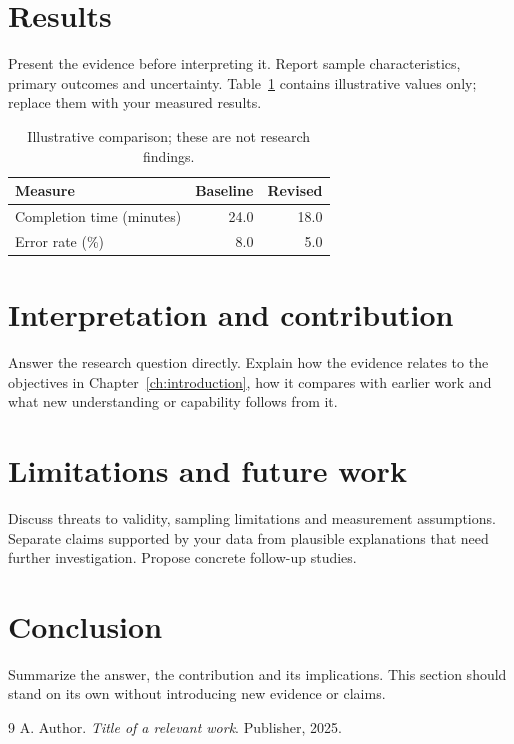 \documentclass[11pt,a4paper,oneside]{report}
\begin{document}
\section{Results}
Present the evidence before interpreting it. Report sample characteristics,
primary outcomes and uncertainty. Table~\ref{tab:outcomes} contains illustrative
values only; replace them with your measured results.
\begin{table}[htbp]
\centering
\caption{Illustrative comparison; these are not research findings.}
\label{tab:outcomes}
\begin{tabularx}{\linewidth}{@{}Xrr@{}}
\toprule
\textbf{Measure} & \textbf{Baseline} & \textbf{Revised}\\
\midrule
Completion time (minutes) & 24.0 & 18.0\\
Error rate (\%) & 8.0 & 5.0\\
\bottomrule
\end{tabularx}
\end{table}
\section{Interpretation and contribution}
Answer the research question directly. Explain how the evidence relates to the
objectives in Chapter~\ref{ch:introduction}, how it compares with earlier work
and what new understanding or capability follows from it.
\section{Limitations and future work}
Discuss threats to validity, sampling limitations and measurement assumptions.
Separate claims supported by your data from plausible explanations that need
further investigation. Propose concrete follow-up studies.
\section{Conclusion}
Summarize the answer, the contribution and its implications. This section should
stand on its own without introducing new evidence or claims.

\renewcommand{\bibname}{References}
\cleardoublepage{}
{}
\begin{thebibliography}{9}
 A. Author. \textit{Title of a relevant work}. Publisher, 2025.
\end{thebibliography}
\appendix
\end{document}

